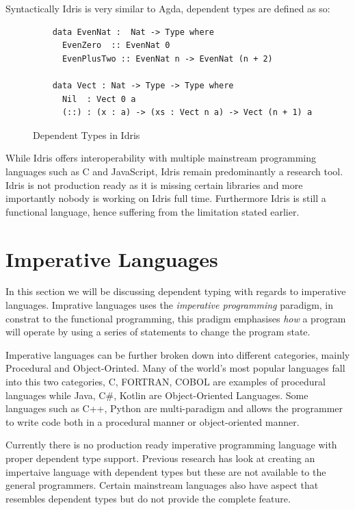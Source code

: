 \documentclass[a4paper,12pt]{report}
\begin{document}
\par
Syntactically Idris is very similar to Agda, dependent types are defined as so: 
\begin{figure}[H]
  \begin{lstlisting}      
    data EvenNat :  Nat -> Type where
      EvenZero  :: EvenNat 0
      EvenPlusTwo :: EvenNat n -> EvenNat (n + 2)
      
    data Vect : Nat -> Type -> Type where
      Nil  : Vect 0 a
      (::) : (x : a) -> (xs : Vect n a) -> Vect (n + 1) a
  \end{lstlisting}
  \caption{Dependent Types in Idris}
\end{figure}

\par
While Idris offers interoperability with multiple mainstream programming 
languages such as C and JavaScript, Idris remain predominantly a research tool. 
Idris is not production ready \cite{gpIdris} as it is missing certain libraries 
and more importantly nobody is working on Idris full time. Furthermore Idris is 
still a functional language, hence suffering from the limitation stated earlier. 

\section{Imperative Languages}

In this section we will be discussing dependent typing with regards to imperative 
languages. Imprative languages uses the \textit{imperative programming} 
\cite{imperativeOverview} paradigm, in constrat to the functional 
programming, this pradigm emphasises \textit{how} a program will operate 
by using a series of statements to change the program state.

\par

Imperative languages can be further broken down into different categories, 
mainly Procedural and Object-Orinted. Many of the world's most popular languages 
fall into this two categories, C, FORTRAN, COBOL are examples of procedural 
languages while Java, C#, Kotlin are Object-Oriented Languages. Some languages such 
as C++, Python are multi-paradigm and allows the programmer to write code both 
in a procedural manner or object-oriented manner. 

\par

Currently there is no production ready imperative programming language with 
proper dependent type support. Previous research has look at creating an 
impertaive language with dependent types but these are not available to the 
general programmers. Certain mainstream languages also have aspect that 
resembles dependent types but do not provide the complete feature.
\end{document}
